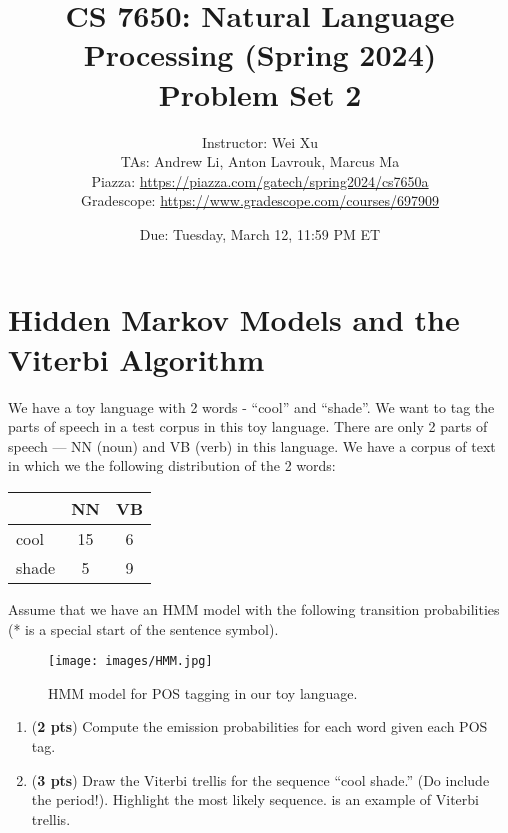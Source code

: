 \documentclass[11pt, letterpaper]{article}
\begin{document}
\title{CS 7650: Natural Language Processing (Spring 2024) \\ Problem Set 2}
\author{Instructor: Wei Xu \\ TAs: Andrew Li, Anton Lavrouk, Marcus Ma
\\Piazza: \url{https://piazza.com/gatech/spring2024/cs7650a}
\\Gradescope: \url{https://www.gradescope.com/courses/697909}}
\date{Due: Tuesday, March 12, 11:59 PM ET}
\maketitle

\section{Hidden Markov Models and the Viterbi Algorithm}
    We have a toy language with 2 words - “cool” and “shade”. We want to tag the parts of speech in a test corpus in this toy language. There are only 2 parts of speech — NN (noun) and VB (verb) in this language. We have a corpus of text in which we the following distribution of the 2 words:
    
    \begin{table}[h!]
    \centering
    \small
    \begin{tabular}{|l | c | c |}
    \hline & NN & VB\\
    \hline
    cool & 15 & 6 \\
    shade & 5 & 9\\
    \hline
    \end{tabular}
    \end{table}
    Assume that we have an HMM model with the following transition probabilities (* is a special start of the sentence symbol).
    
    \begin{figure}[h]
    \centering
    \texttt{[image: images/HMM.jpg]}
    \caption{HMM model for POS tagging in our toy language.}
    \end{figure}

\begin{enumerate}[label=(\alph*)]
\item (\textbf{2 pts}) Compute the emission probabilities for each word given each POS tag.\\

\item (\textbf{3 pts}) Draw the Viterbi trellis for the sequence “cool shade.” (Do include the period!). Highlight the most likely sequence. \href{https://web.stanford.edu/~jurafsky/slp3/A.pdf#page=8}{\color{blue}{Here}} is an  example of Viterbi trellis.

\end{enumerate}
\end{document}
